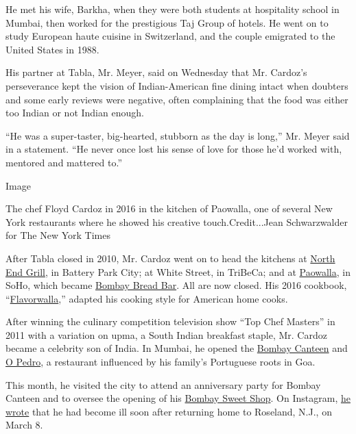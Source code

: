 He met his wife, Barkha, when they were both students at hospitality
school in Mumbai, then worked for the prestigious Taj Group of hotels.
He went on to study European haute cuisine in Switzerland, and the
couple emigrated to the United States in 1988.

His partner at Tabla, Mr. Meyer, said on Wednesday that Mr. Cardoz's
perseverance kept the vision of Indian-American fine dining intact when
doubters and some early reviews were negative, often complaining that
the food was either too Indian or not Indian enough.

``He was a super-taster, big-hearted, stubborn as the day is long,'' Mr.
Meyer said in a statement. ``He never once lost his sense of love for
those he'd worked with, mentored and mattered to.''

Image

The chef Floyd Cardoz in 2016 in the kitchen of Paowalla, one of several
New York restaurants where he showed his creative touch.Credit...Jean
Schwarzwalder for The New York Times

After Tabla closed in 2010, Mr. Cardoz went on to head the kitchens at
\href{https://www.nytimes.com/2015/01/28/dining/restaurant-review-blue-smoke-and-north-end-grill.html}{North
End Grill}, in Battery Park City; at White Street, in TriBeCa; and at
\href{https://www.nytimes.com/2016/11/09/dining/paowalla-review.html}{Paowalla},
in SoHo, which became
\href{https://www.nytimes.com/2018/02/15/dining/floyd-cardoz-paowalla-closing-bombay-bread-bar.html}{Bombay
Bread Bar}. All are now closed. His 2016 cookbook,
``\href{https://www.wnyc.org/story/flavorwalla/}{Flavorwalla},'' adapted
his cooking style for American home cooks.

After winning the culinary competition television show ``Top Chef
Masters'' in 2011 with a variation on upma, a South Indian breakfast
staple, Mr. Cardoz became a celebrity son of India. In Mumbai, he opened
the \href{http://thebombaycanteen.com/}{Bombay Canteen} and
\href{https://www.nytimes.com/2018/05/19/travel/o-pedro-restaurant-mumbai-review.html}{O
Pedro}, a restaurant influenced by his family's Portuguese roots in Goa.

This month, he visited the city to attend an anniversary party for
Bombay Canteen and to oversee the opening of his
\href{https://www.bombaysweetshop.com/}{Bombay Sweet Shop}. On
Instagram, \href{https://www.instagram.com/p/B92S1FunVEX/}{he wrote}
that he had become ill soon after returning home to Roseland, N.J., on
March 8.

